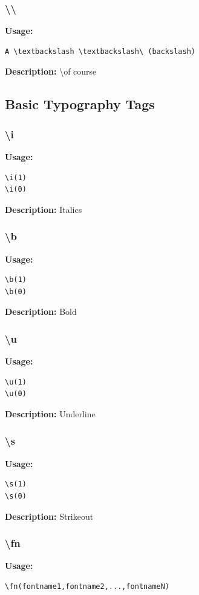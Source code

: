 \documentclass{spec}
\begin{document}
\subsubsection{\textbackslash \textbackslash}
\textbf{Usage:}
\begin{verbatim}
A \textbackslash \textbackslash\ (backslash)
\end{verbatim}

\textbf{Description:}
\textbackslash of course


\subsection{Basic Typography Tags}

\subsubsection{\textbackslash i}
\textbf{Usage:}
\begin{verbatim}
\i(1)
\i(0)
\end{verbatim}

\textbf{Description:}
Italics

\subsubsection{\textbackslash b}
\textbf{Usage:}
\begin{verbatim}
\b(1)
\b(0)
\end{verbatim}

\textbf{Description:}
Bold

\subsubsection{\textbackslash u}
\textbf{Usage:}
\begin{verbatim}
\u(1)
\u(0)
\end{verbatim}

\textbf{Description:}
Underline

\subsubsection{\textbackslash s}
\textbf{Usage:}
\begin{verbatim}
\s(1)
\s(0)
\end{verbatim}

\textbf{Description:}
Strikeout

\subsubsection{\textbackslash fn}
\textbf{Usage:}
\begin{verbatim}
\fn(fontname1,fontname2,...,fontnameN)
\end{verbatim}
\end{document}
